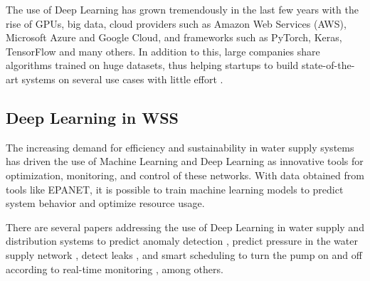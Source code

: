 The use of Deep Learning has grown tremendously in the last few years with the rise of GPUs, big data, cloud providers such as Amazon Web Services (AWS), Microsoft Azure and Google Cloud, and frameworks such as PyTorch, Keras, TensorFlow and many others. In addition to this, large companies share algorithms trained on huge datasets, thus helping startups to build state-of-the-art systems on several use cases with little effort \cite{rfc23}.


\subsection{Deep Learning in WSS}


\begin{comment}
A crescente demanda por eficiência e sustentabilidade nos sistemas de abastecimento de água tem impulsionado o uso de Machine Learning (ML) e Deep Learning (DL) como ferramentas inovadoras para otimização, monitoramento e controle dessas redes. Com os dados obtidos por ferramentas como EPANET, é possível treinar modelos de aprendizado de máquina para prever o comportamento do sistema e otimizar o uso de recursos.

Há diversos papers abordando o uso de Deep Learning em sistemas de abastecimento e distribuição de água para prever detecção de anomalias\cite{rfc12}, prever pressão na rede de suprimento de água\cite{rfc11}, detecção de vazamentos\cite{rfc13}, agendamento inteligente para ligar e desligar a bomba, de acordo com o monitoramento em tempo real\cite{rfc9} entre outros.
    
\end{comment}





The increasing demand for efficiency and sustainability in water supply systems has driven the use of Machine Learning and Deep Learning as innovative tools for optimization, monitoring, and control of these networks. With data obtained from tools like EPANET, it is possible to train machine learning models to predict system behavior and optimize resource usage.

There are several papers addressing the use of Deep Learning in water supply and distribution systems to predict anomaly detection \cite{rfc12}, predict pressure in the water supply network \cite{rfc11}, detect leaks \cite{rfc13}, and smart scheduling to turn the pump on and off according to real-time monitoring \cite{rfc9}, among others.



